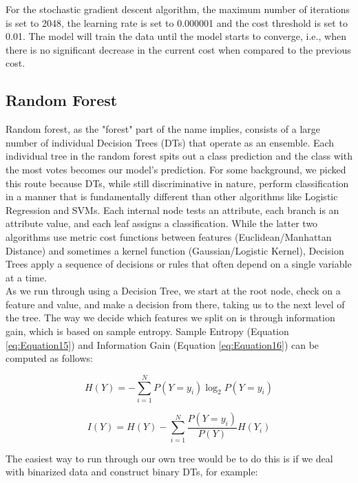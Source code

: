 \noindent For the stochastic gradient descent algorithm, the maximum number of iterations is set to 2048, the learning rate is set to 0.000001 and the cost threshold is set to 0.01. The model will train the data until the model starts to converge, i.e., when there is no significant decrease in the current cost when compared to the previous cost.

\subsection{Random Forest}
\label{sec:methods:Random Forest}

Random forest, as the "forest" part of the name implies, consists of a large number of individual Decision Trees (DTs) that operate as an ensemble. Each individual tree in the random forest spits out a class prediction and the class with the most votes becomes our model’s prediction. For some background, we picked this route because DTs, while still discriminative in nature, perform classification in a manner that is fundamentally different than other algorithms like Logistic Regression and SVMs. Each internal node tests an attribute, each branch is an attribute value, and each leaf assigns a classification. While the latter two algorithms use metric cost functions between features (Euclidean/Manhattan Distance) and sometimes a kernel function (Gaussian/Logistic Kernel), Decision Trees apply a sequence of decisions or rules that often depend on a single variable at a time.\\

\noindent As we run through using a Decision Tree, we start at the root node, check on a feature and value, and make a decision from there, taking us to the next level of the tree. The way we decide which features we split on is through information gain, which is based on sample entropy. Sample Entropy (Equation \eqref{eq:Equation15}) and Information Gain (Equation \eqref{eq:Equation16}) can be computed as follows:

\begin{equation}
    \label{eq:Equation15}
    H(Y) = - \sum_{i=1}^N P(Y=y_i) \log_2 P(Y=y_i)
\end{equation}

\begin{equation}
    \label{eq:Equation16}
    I(Y) = H(Y) - \sum_{i = 1}^{N} \dfrac{P(Y = y_{i})}{P(Y)} H(Y_{i})
\end{equation}

\noindent The easiest way to run through our own tree would be to do this is if we deal with binarized data and construct binary DTs, for example:

